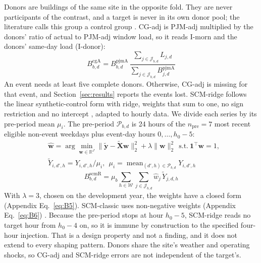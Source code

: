 Donors are buildings of the same site in the opposite fold. They are never participants of the contrast, and a target is never in its own donor pool; the literature calls this group a control group \cite{caiso_bawg2017}. CG-adj is PJM-adj multiplied by the donors' ratio of actual to PJM-adj window load, so it reads I-morn and the donors' same-day load (I-donor):
\begin{equation}\label{eq:cga}
B^{\mathrm{cgA}}_{b,d}=B^{\mathrm{pjmA}}_{b,d}\,\frac{\sum_{j\in\mathcal{J}_{b,d}}L_{j,d}}{\sum_{j\in\mathcal{J}_{b,d}}B^{\mathrm{pjmA}}_{j,d}}
\end{equation}
An event needs at least five complete donors. Otherwise, CG-adj is missing for that event, and Section~\ref{sec:results} reports the events lost. SCM-ridge follows the linear synthetic-control form with ridge, weights that sum to one, no sign restriction and no intercept \cite{sievers2026,doudchenko2016}, adapted to hourly data. We divide each series by its pre-period mean $\mu_i$. The pre-period $\mathcal{P}_{b,d}$ is 24 hours of the $n_{\mathrm{pre}}=7$ most recent eligible non-event weekdays plus event-day hours $0,\dots,h_0-5$:
\begin{equation}\label{eq:scmw}
\begin{aligned}&\hat{\mathbf{w}}=\arg\min_{\mathbf{w}\in\mathbb{R}^{J}}\bigl\lVert\tilde{\mathbf{y}}-\tilde{\mathbf{X}}\mathbf{w}\bigr\rVert_{2}^{2}+\lambda\lVert\mathbf{w}\rVert_{2}^{2}\ \ \text{s.t.}\ \mathbf{1}^{\top}\mathbf{w}=1,\\ &\tilde{Y}_{i,d',h}=Y_{i,d',h}/\mu_{i},\ \ \mu_{i}=\operatorname{mean}_{(d',h)\in\mathcal{P}_{b,d}}Y_{i,d',h}\end{aligned}%
\end{equation}
\begin{equation}\label{eq:scmb}
B^{\mathrm{scmR}}_{b,d}=\mu_{b}\sum_{h\in\mathcal{W}}\sum_{j\in\mathcal{J}_{b,d}}\hat{w}_{j}\,\tilde{Y}_{j,d,h}
\end{equation}
With $\lambda=3$, chosen on the development year, the weights have a closed form (Appendix Eq.~\eqref{eq:B5}). SCM-classic uses non-negative weights (Appendix Eq.~\eqref{eq:B6}) \cite{abadie2010}. Because the pre-period stops at hour $h_0-5$, SCM-ridge reads no target hour from $h_0-4$ on, so it is immune by construction to the specified four-hour injection. That is a design property and not a finding, and it does not extend to every shaping pattern. Donors share the site's weather and operating shocks, so CG-adj and SCM-ridge errors are not independent of the target's.

